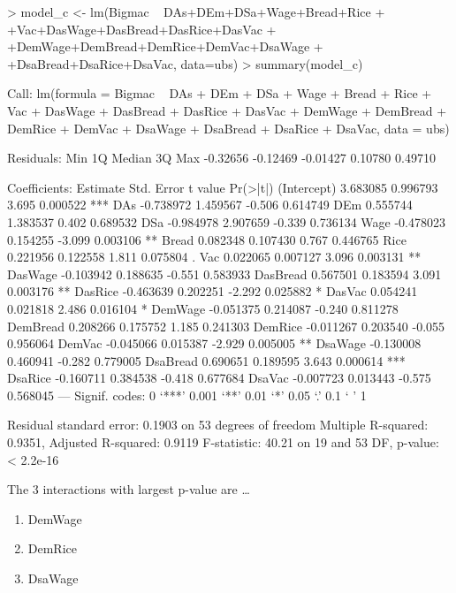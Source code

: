 \documentclass{article}
\begin{document}
\begin{Schunk}
\begin{Sinput}
> model_c <- lm(Bigmac ~ DAs+DEm+DSa+Wage+Bread+Rice
+               +Vac+DasWage+DasBread+DasRice+DasVac
+               +DemWage+DemBread+DemRice+DemVac+DsaWage
+               +DsaBread+DsaRice+DsaVac, data=ubs)
> summary(model_c)
\end{Sinput}
\begin{Soutput}
Call:
lm(formula = Bigmac ~ DAs + DEm + DSa + Wage + Bread + Rice + 
    Vac + DasWage + DasBread + DasRice + DasVac + DemWage + DemBread + 
    DemRice + DemVac + DsaWage + DsaBread + DsaRice + DsaVac, 
    data = ubs)

Residuals:
     Min       1Q   Median       3Q      Max 
-0.32656 -0.12469 -0.01427  0.10780  0.49710 

Coefficients:
             Estimate Std. Error t value Pr(>|t|)    
(Intercept)  3.683085   0.996793   3.695 0.000522 ***
DAs         -0.738972   1.459567  -0.506 0.614749    
DEm          0.555744   1.383537   0.402 0.689532    
DSa         -0.984978   2.907659  -0.339 0.736134    
Wage        -0.478023   0.154255  -3.099 0.003106 ** 
Bread        0.082348   0.107430   0.767 0.446765    
Rice         0.221956   0.122558   1.811 0.075804 .  
Vac          0.022065   0.007127   3.096 0.003131 ** 
DasWage     -0.103942   0.188635  -0.551 0.583933    
DasBread     0.567501   0.183594   3.091 0.003176 ** 
DasRice     -0.463639   0.202251  -2.292 0.025882 *  
DasVac       0.054241   0.021818   2.486 0.016104 *  
DemWage     -0.051375   0.214087  -0.240 0.811278    
DemBread     0.208266   0.175752   1.185 0.241303    
DemRice     -0.011267   0.203540  -0.055 0.956064    
DemVac      -0.045066   0.015387  -2.929 0.005005 ** 
DsaWage     -0.130008   0.460941  -0.282 0.779005    
DsaBread     0.690651   0.189595   3.643 0.000614 ***
DsaRice     -0.160711   0.384538  -0.418 0.677684    
DsaVac      -0.007723   0.013443  -0.575 0.568045    
---
Signif. codes:  0 ‘***’ 0.001 ‘**’ 0.01 ‘*’ 0.05 ‘.’ 0.1 ‘ ’ 1

Residual standard error: 0.1903 on 53 degrees of freedom
Multiple R-squared:  0.9351,	Adjusted R-squared:  0.9119 
F-statistic: 40.21 on 19 and 53 DF,  p-value: < 2.2e-16
\end{Soutput}
\end{Schunk}

The 3 interactions with largest p-value are \ldots
\begin{enumerate}
\item DemWage
\item DemRice
\item DsaWage
\end{enumerate}
\end{document}
